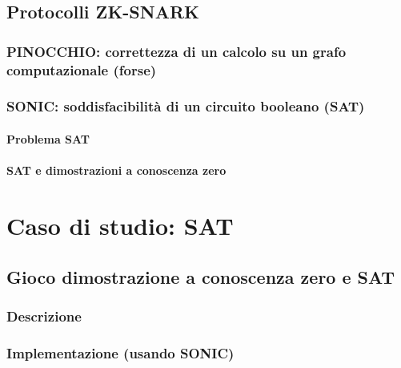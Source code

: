 \documentclass{article}
\theoremstyle{definition}
\begin{document}
\subsection{Protocolli ZK-SNARK}
\subsubsection{PINOCCHIO: correttezza di un calcolo su un grafo computazionale (forse)}
\subsubsection{SONIC: soddisfacibilità di un circuito booleano (SAT)}
\paragraph{Problema SAT}
\paragraph{SAT e dimostrazioni a conoscenza zero}

\section{Caso di studio: SAT}
\subsection{Gioco dimostrazione a conoscenza zero e SAT}
\subsubsection{Descrizione}
\subsubsection{Implementazione (usando SONIC)}



\clearpage


\nocite{*} %
\printbibliography
\end{document}
